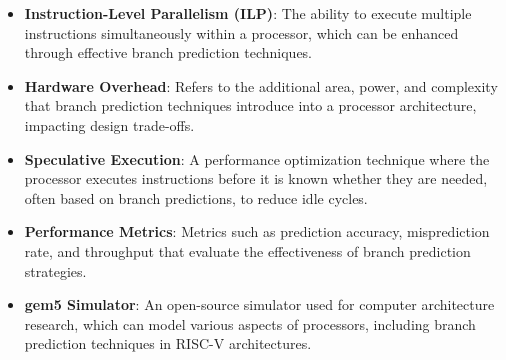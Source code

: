 \documentclass[10pt,journal,compsoc]{IEEEtran}
\begin{document}
\begin{itemize}
    \item \textbf{Instruction-Level Parallelism (ILP)}: The ability to execute multiple instructions simultaneously within a processor, which can be enhanced through effective branch prediction techniques.
    
    \item \textbf{Hardware Overhead}: Refers to the additional area, power, and complexity that branch prediction techniques introduce into a processor architecture, impacting design trade-offs.
    
    \item \textbf{Speculative Execution}: A performance optimization technique where the processor executes instructions before it is known whether they are needed, often based on branch predictions, to reduce idle cycles.
    
    \item \textbf{Performance Metrics}: Metrics such as prediction accuracy, misprediction rate, and throughput that evaluate the effectiveness of branch prediction strategies.
    
    \item \textbf{gem5 Simulator}: An open-source simulator used for computer architecture research, which can model various aspects of processors, including branch prediction techniques in RISC-V architectures.\cite{lowepower2020gem5simulatorversion200}
\end{itemize}
\end{document}
